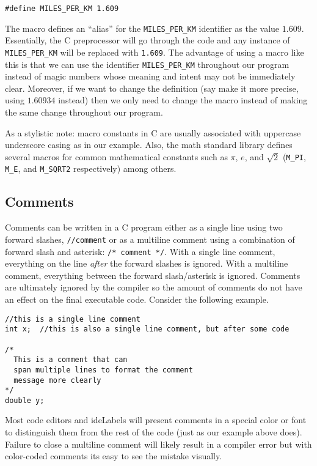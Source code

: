 \begin{verbatim}
#define MILES_PER_KM 1.609
\end{verbatim}

The macro defines an ``alias'' for the \texttt{MILES_PER_KM} identifier as the
value $1.609$.  Essentially, the C preprocessor will go through the code and any
instance of \texttt{MILES_PER_KM} will be replaced with \texttt{1.609}.
The advantage of using a macro like this is that we can use the identifier \texttt{MILES_PER_KM}
throughout our program instead of \glspl{magic number} whose meaning and intent
may not be immediately clear.  Moreover, if we want to change the definition (say make it more
precise, using $1.60934$ instead) then we only need to change the macro instead of making the
same change throughout our program.

As a stylistic note: macro constants in C are usually associated with uppercase 
underscore casing as in our example.  Also, the math standard library defines several
macros for common mathematical constants such as $\pi$, $e$, and $\sqrt{2}$ 
(\texttt{M_PI}, \texttt{M_E}, and \texttt{M_SQRT2} 
respectively) among others.

\subsection{Comments}

Comments can be written in a C program either as a single line using
two forward slashes, \texttt{//comment} or as a multiline comment using
a combination of forward slash and asterisk: \texttt{/* comment */}.  
With a single line comment, everything on the line \emph{after} the forward
slashes is ignored.  With a multiline comment, everything between the forward
slash/asterisk is ignored.  Comments are ultimately ignored by the compiler so
the amount of comments do not have an effect on the final executable code.
Consider the following example.

\begin{verbatim}
//this is a single line comment
int x;  //this is also a single line comment, but after some code

/*
  This is a comment that can 
  span multiple lines to format the comment
  message more clearly
*/
double y;
\end{verbatim}

Most code editors and \glspl{ideLabel} will present comments in a special color or
font to distinguish them from the rest of the code (just as our example above does).
Failure to close a multiline comment will likely result in a compiler error but with
color-coded comments its easy to see the mistake visually.

